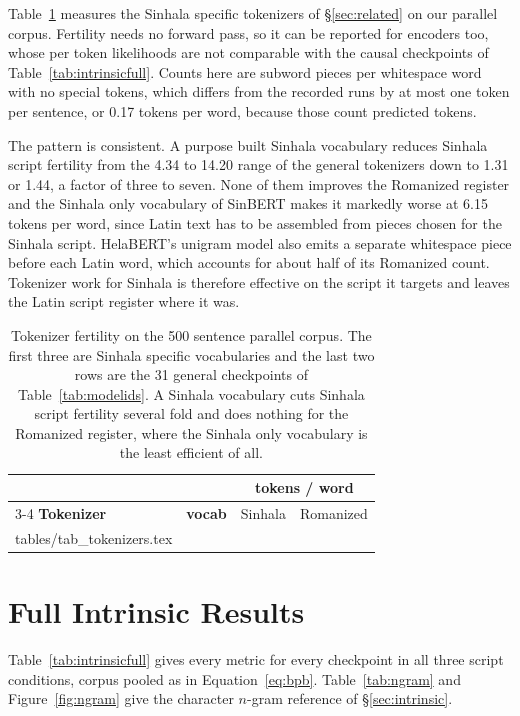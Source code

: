 \documentclass[11pt]{article}
\makeatletter
\newcommand{\rows}[1]{\@@input #1 }
\makeatother
\begin{document}
Table~\ref{tab:tokenizers} measures the Sinhala specific tokenizers of
\S\ref{sec:related} on our parallel corpus. Fertility needs no forward pass, so it can
be reported for encoders too, whose per token likelihoods are not comparable with the
causal checkpoints of Table~\ref{tab:intrinsicfull}. Counts here are subword pieces per
whitespace word with no special tokens, which differs from the recorded runs by at most
one token per sentence, or 0.17 tokens per word, because those count predicted tokens.

The pattern is consistent. A purpose built Sinhala vocabulary reduces Sinhala script
fertility from the 4.34 to 14.20 range of the general tokenizers down to 1.31 or 1.44,
a factor of three to seven. None of them improves the Romanized register and the
Sinhala only vocabulary of SinBERT makes it markedly worse at 6.15 tokens per word,
since Latin text has to be assembled from pieces chosen for the Sinhala script.
HelaBERT's unigram model also emits a separate whitespace piece before each Latin word,
which accounts for about half of its Romanized count. Tokenizer work for Sinhala is
therefore effective on the script it targets and leaves the Latin script register where
it was.

\begin{table}[t]
\centering\small
\setlength{\tabcolsep}{2pt}
\begin{tabular}{@{}lrcc@{}}
\toprule
& & \multicolumn{2}{c}{\textbf{tokens / word}} \\
\cmidrule(lr){3-4}
\textbf{Tokenizer} & \textbf{vocab} & Sinhala & Romanized \\
\midrule
\rows{tables/tab_tokenizers.tex}
\bottomrule
\end{tabular}
\caption{Tokenizer fertility on the 500 sentence parallel corpus. The first three are
Sinhala specific vocabularies and the last two rows are the 31 general checkpoints of
Table~\ref{tab:modelids}. A Sinhala vocabulary cuts Sinhala script fertility several
fold and does nothing for the Romanized register, where the Sinhala only vocabulary is
the least efficient of all.}
\label{tab:tokenizers}
\end{table}

\section{Full Intrinsic Results}
\label{sec:fullintrinsic}

Table~\ref{tab:intrinsicfull} gives every metric for every checkpoint in all three
script conditions, corpus pooled as in Equation~\ref{eq:bpb}.
Table~\ref{tab:ngram} and Figure~\ref{fig:ngram} give the character $n$-gram
reference of \S\ref{sec:intrinsic}.
\end{document}
